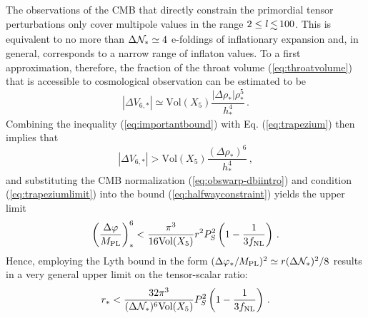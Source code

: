 The observations of the CMB 
that directly constrain the primordial tensor perturbations only 
cover multipole values in the range $2 \le l \, \lsim \, 100$. 
This is equivalent to no more than ${\Delta {\cal{N}}_{*}} \simeq {4}$ 
e-foldings of inflationary expansion and, in general,   
corresponds to a narrow range of inflaton values. 
To a first approximation, therefore, the fraction of the throat volume 
(\ref{eq:throatvolume}) that is accessible to cosmological 
observation can be estimated to be 
% 
\begin{equation}
\label{eq:trapezium}
| \Delta V_{6,*} | \simeq \mathrm{Vol}(X_5) 
\frac{|\Delta \rho_*| \rho^5_{*}}{h^{4}_{*}} \,.
\end{equation}
% 
Combining the inequality (\ref{eq:importantbound}) with Eq. (\ref{eq:trapezium}) 
then implies that 
% 
\begin{equation}
\label{eq:trapeziumlimit}
|\Delta V _{6,*}| > \mathrm{Vol}(X_5) 
\frac{(\Delta \rho_* )^6}{h^{4}_*}  \,,
\end{equation}
% 
and substituting the CMB normalization (\ref{eq:obswarp-dbiintro}) and 
condition (\ref{eq:trapeziumlimit}) into the bound (\ref{eq:halfwayconstraint}) 
yields the upper limit   
% 
\begin{equation}
\label{eq:boundpower6}
\left( \frac{\Delta \varphi}{M_{\mathrm{PL}}} \right)^6_{*} 
< \frac{\pi^3}{16\mathrm{Vol}(X_5)} r^2 P_S^2 
\left( 1- \frac{1}{3f_{\mathrm{NL}}} \right)  \,.
\end{equation}
% 
Hence, employing the Lyth bound in the form $(\Delta \varphi_* / M_{\mathrm{PL}} )^2 \simeq 
r (\Delta {\cal{N}}_*)^2 /8$  
results in a very general upper limit on the tensor-scalar ratio: 
% 
\begin{equation}
\label{eq:generalbound}
r_{*} < \frac{32 \pi^3}{(\Delta {\cal{N}}_*)^6 \mathrm{Vol}(X_5)} 
P_S^2 \left( 1- \frac{1}{3f_{\mathrm{NL}}} \right) \,.
\end{equation}
% 


